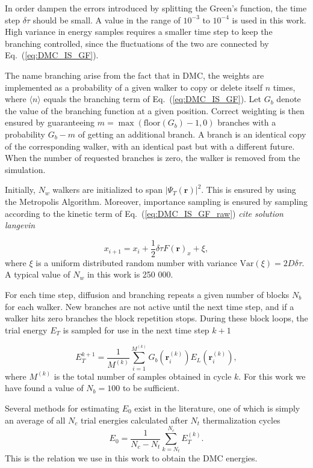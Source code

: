 \documentclass[amsmath, amssymb, aps, floatfix, nofootinbib, preprintnumbers,showpacs, superscriptaddress, twocolumn]{revtex4-1}
\begin{document}
In order dampen the errors introduced by splitting the Green's function, the time step $\delta\tau$ should be small. A value in the range of $10^{-3}$ to $10^{-4}$ is used in this work. High variance in energy samples requires a smaller time step to keep the branching controlled, since the fluctuations of the two are connected by Eq.~(\ref{eq:DMC_IS_GF}).

The name branching arise from the fact that in DMC, the weights are implemented as a probability of a given walker to copy or delete itself $n$ times, where $\langle n \rangle$ equals the branching term of Eq.~(\ref{eq:DMC_IS_GF}). Let $G_b$ denote the value of the branching function at a given position. Correct weighting is then ensured by guaranteeing $m = \max\left(\mathrm{floor}\left(G_b\right)-1, 0\right)$ branches with a probability $G_b - m$ of getting an additional branch. A branch is an identical copy of the corresponding walker, with an identical past but with a different future. When the number of requested branches is zero, the walker is removed from the simulation.


Initially, $N_w$ walkers are initialized to span $|\Psi_T(\mathbf{r})|^2$. This is ensured by using the Metropolis Algorithm. Moreover, importance sampling is ensured by sampling according to the kinetic term of  Eq.~(\ref{eq:DMC_IS_GF_raw}) \textit{cite solution langevin}

\begin{equation}
x_{i+1} = x_i + \frac{1}{2}\delta\tau F(\mathbf{r})_x + \xi,
\end{equation}
\noindent
where $\xi$ is a uniform distributed random number with variance $\mathrm{Var}(\xi) = 2D\delta\tau$. A typical value of $N_w$ in this work is 250 000.

For each time step, diffusion and branching repeats a given number of blocks $N_b$ for each walker. New branches are not active until the next time step, and if a walker hits zero branches the block repetition stops. During these block loops, the trial energy $E_T$ is sampled for use in the next time step $k+1$

\begin{equation}
 E_T^{k+1} = \frac{1}{M^{(k)}}\sum_{i=1}^{M^{(k)}} G_b(\mathbf{r}^{(k)}_i)E_L(\mathbf{r}^{(k)}_i),
\end{equation}
\noindent
where $M^{(k)}$ is the total number of samples obtained in cycle $k$. For this work we have found a value of $N_b = 100$ to be sufficient.

Several methods for estimating $E_0$ exist in the literature, one of which is simply an average of all $N_c$ trial energies calculated after $N_t$ thermalization cycles
\begin{equation}
 E_0 = \frac{1}{N_c-N_t}\sum\limits_{k=N_t}^{N_c} E_T^{(k)}.
\end{equation}
This is the relation we use in this work to obtain the DMC energies.
\end{document}

